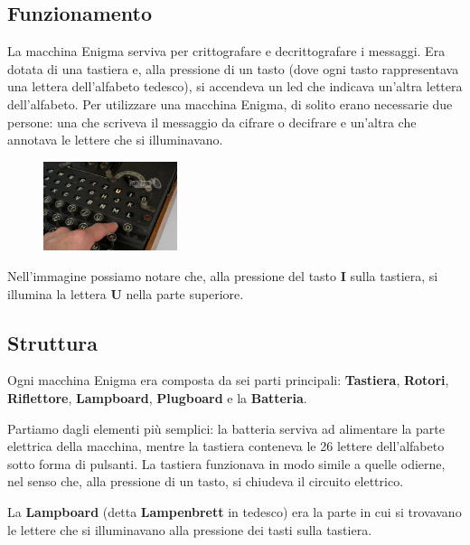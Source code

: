 \documentclass{rapport}
\begin{document}
\subsection{Funzionamento}

La macchina Enigma serviva per crittografare e decrittografare i messaggi. Era dotata di una tastiera e, alla pressione di un tasto (dove ogni tasto rappresentava una lettera dell'alfabeto tedesco), si accendeva un led che indicava un'altra lettera dell'alfabeto. Per utilizzare una macchina Enigma, di solito erano necessarie due persone: una che scriveva il messaggio da cifrare o decifrare e un'altra che annotava le lettere che si illuminavano.

\begin{figure}
    \centering
    \vspace{-1.5cm}
    \includegraphics[width=0.35\textwidth]{logos/enigma2.jpg}
\end{figure}

\vspace{+1.5cm}

Nell'immagine possiamo notare che, alla pressione del tasto \textbf{I} sulla tastiera, si illumina la lettera \textbf{U} nella parte superiore.

\afterpage{\clearpage}



\newpage
\subsection{Struttura}

Ogni macchina Enigma era composta da sei parti principali: \textbf{Tastiera}, \textbf{Rotori}, \textbf{Riflettore}, \textbf{Lampboard}, \textbf{Plugboard} e la \textbf{Batteria}.  

Partiamo dagli elementi più semplici: la batteria serviva ad alimentare la parte elettrica della macchina, mentre la tastiera conteneva le 26 lettere dell'alfabeto sotto forma di pulsanti. La tastiera funzionava in modo simile a quelle odierne, nel senso che, alla pressione di un tasto, si chiudeva il circuito elettrico.  

La \textbf{Lampboard} (detta \textbf{Lampenbrett} in tedesco) era la parte in cui si trovavano le lettere che si illuminavano alla pressione dei tasti sulla tastiera.  
\end{document}
